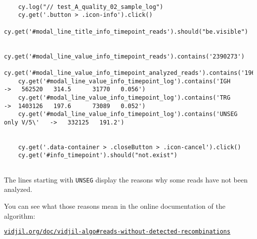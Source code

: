 \begin{verbatim}

    cy.log("// test_A_quality_02_sample_log")
    cy.get('.button > .icon-info').click()
    cy.get('#modal_line_title_info_timepoint_reads').should("be.visible")

    cy.get('#modal_line_value_info_timepoint_reads').contains('2390273')
    cy.get('#modal_line_value_info_timepoint_analyzed_reads').contains('1967338')
    cy.get('#modal_line_value_info_timepoint_log').contains('IGH               ->   562520   314.5      31770   0.056')
    cy.get('#modal_line_value_info_timepoint_log').contains('TRG               ->  1403126   197.6      73089   0.052')
    cy.get('#modal_line_value_info_timepoint_log').contains('UNSEG only V/5\'   ->   332125   191.2')


    cy.get('.data-container > .closeButton > .icon-cancel').click()
    cy.get('#info_timepoint').should("not.exist")


\end{verbatim}

The lines starting with \texttt{UNSEG} display the reasons why some reads have
not been analyzed.

You can see what those reasons mean in the online documentation of the
algorithm:

 \centerline{\tt\href{http://www.vidjil.org/doc/vidjil-algo/\#reads-without-detected-recombinations}{vidjil.org/doc/vidjil-algo\#reads-without-detected-recombinations}}



